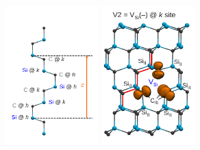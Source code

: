 \begin{figure}[H]
    \begin{center}
        \includegraphics[width=0.32\textwidth]{figures/SiC-non-equiv-sites.pdf}
        \hspace{1em}
        \includegraphics[width=0.32\textwidth]{figures/SiC-V2.pdf}
    \end{center}
    \caption{}\label{fig:}
\end{figure}
